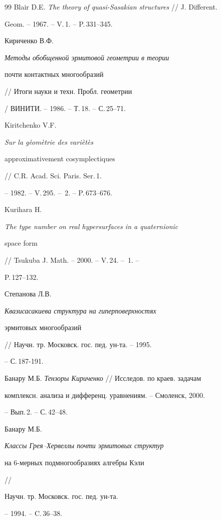 \begin{thebibliography}{99}
Blair D.E. {\em The theory of quasi-Sasakian structures} // J. Different.


Geom. -- 1967. -- V.\,1. -- P.\,331--345.




Кириченко В.Ф. {\em Методы обобщенной эрмитовой геометрии в теории 


почти контактных многообразий} // Итоги науки и техн. Пробл. геометрии


/ ВИНИТИ. -- 1986. -- Т.\,18. -- С.\,25--71.




Kiritchenko V.F. {\em Sur la g\`eom\`etrie des vari\`et\`es 


approximativement cosymplectiques} // C.R. Acad. Sci. Paris. Ser.\,1.


-- 1982. -- V.\,295. -- \No\,2. -- P.\,673--676.




Kurihara H. {\em The type number on real hypersurfaces in a quaternionic 


space form} // Tsukuba J. Math. -- 2000. -- V.\,24. -- \No\,1. --


P.\,127--132.




Степанова Л.В. {\em Квазисасакиева структура на гиперповерхностях


эрмитовых многообразий} // Научн. тр. Московск. гос. пед. ун-та. -- 1995. 


-- С.\,187-191.




Банару М.Б. {\em Тензоры Кириченко} // Исследов. по краев. задачам 


комплексн. анализа и дифференц. уравнениям. -- Смоленск, 2000. 


-- Вып.\,2. -- С.\,42--48.




Банару М.Б. {\em Классы Грея--Хервеллы почти эрмитовых структур 


на 6-мерных подмногообразиях алгебры Кэли} //


Научн. тр. Московск. гос. пед. ун-та.


-- 1994. -- C.\,36--38.





\end{thebibliography}





\vskip 2cm












\label{end}





